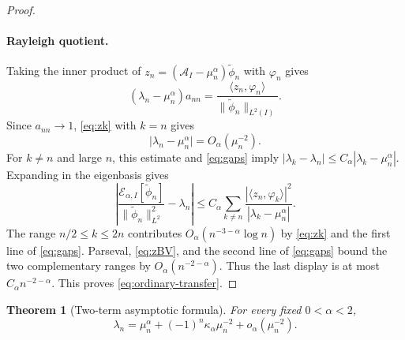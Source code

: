 \documentclass[11pt]{amsart}
\numberwithin{equation}{section}
\newtheorem{theorem}{Theorem}[section]
\theoremstyle{remark}
\newcommand{\wt}{\widetilde}
\newcommand{\norm}[2][]{\lVert #2\rVert_{#1}}
\newcommand{\abs}[1]{\lvert #1\rvert}
\newcommand{\ip}[2]{\langle #1,#2\rangle}
\newcommand{\calE}{\mathcal E}
\begin{document}
\begin{proof}
\paragraph{\textbf{Rayleigh quotient.}}
Taking the inner product of
$z_n=(\mathcal A_I-\mu_n^\alpha)\wt\phi_n$ with $\varphi_n$ gives
\[
 (\lambda_n-\mu_n^\alpha)a_{nn}
 =\frac{\ip{z_n}{\varphi_n}}{\norm[L^2(I)]{\wt\phi_n}}.
\]
Since $a_{nn}\to1$, \eqref{eq:zk} with $k=n$ gives
\begin{equation}\label{eq:lambda-mu-close}
 \abs{\lambda_n-\mu_n^\alpha}=O_\alpha(\mu_n^{-2}).
\end{equation}
For $k\ne n$ and large $n$, this estimate and \eqref{eq:gaps} imply
$|\lambda_k-\lambda_n|\le
C_\alpha|\lambda_k-\mu_n^\alpha|$.  Expanding in the eigenbasis gives
\[
 \left|\frac{\calE_{\alpha,I}[\wt\phi_n]}
 {\norm[L^2]{\wt\phi_n}^2}-\lambda_n\right|
 \le C_\alpha\sum_{k\ne n}
 \frac{|\ip{z_n}{\varphi_k}|^2}{|\lambda_k-\mu_n^\alpha|}.
\]
The range $n/2\le k\le2n$ contributes
$O_\alpha(n^{-3-\alpha}\log n)$ by \eqref{eq:zk} and the first line of
\eqref{eq:gaps}.  Parseval, \eqref{eq:zBV}, and the second line of
\eqref{eq:gaps} bound the two complementary ranges by
$O_\alpha(n^{-2-\alpha})$.  Thus the last display is at most
$C_\alpha n^{-2-\alpha}$.
This proves \eqref{eq:ordinary-transfer}.
\end{proof}

\begin{theorem}[Two-term asymptotic formula]\label{thm:two-term}
For every fixed $0<\alpha<2$,
\begin{equation}\label{eq:third}
 \lambda_n=\mu_n^\alpha+(-1)^n\kappa_\alpha\mu_n^{-2}
 +o_\alpha(\mu_n^{-2}).
\end{equation}
\end{theorem}
\end{document}
